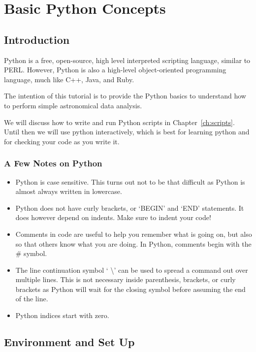 \chapter{Basic Python Concepts}
\label{ch:intro}
\section{Introduction }
Python is a free, open-source, high level interpreted scripting language, similar to PERL. 
 However, Python is
also a high-level object-oriented programming language,
much like C++, Java, and Ruby.

The intention of this tutorial is to provide the Python basics
to understand how to perform simple astronomical data analysis.

We will discuss how to write and run Python scripts in Chapter~\ref{ch:scripts}.
Until then we will use python interactively, which is best for learning
python and for checking your code as you write it.

\subsection{A Few Notes on Python}
\begin{itemize}
\item Python is case sensitive.  This turns out not to be that
  difficult as Python is almost always written in lowercase.   
\item Python does not have curly brackets, or `BEGIN' and `END'
  statements.  It does however depend on indents.  Make sure to indent
  your code!
\item Comments in code are useful to help you remember what is going
  on, but also so that others know what you are doing.  In Python,
  comments begin with the \# symbol.
\item The line continuation symbol ` \textbackslash ' can be used to
  spread a command out over multiple lines.  This is not necessary
  inside parenthesis, brackets, or curly brackets as Python will wait
  for the closing symbol before assuming the end of the line.
\item Python indices start with zero.  
\end{itemize}

\section{Environment and Set Up}
